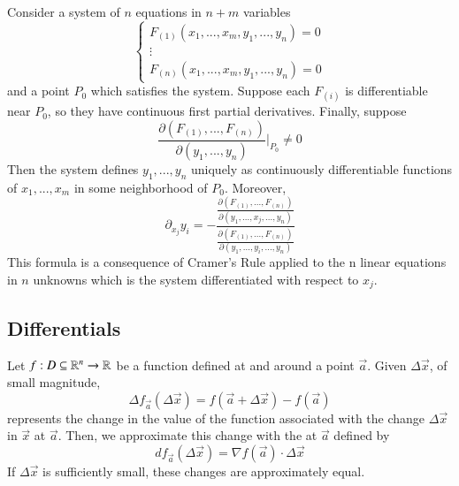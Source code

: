 \begin{appendices}
    \begin{namthm}
        Consider a system of $n$ equations in $n+m$ variables \begin{equation}
            \left\{\begin{array}{l} F_{(1)}(x_1,...,x_m,y_1,...,y_n) = 0 \\ \vdots \\ F_{(n)}(x_1,...,x_m,y_1,...,y_n) = 0 \end{array}\right.
        \end{equation}
        and a point $P_0$ which satisfies the system. Suppose each $F_{(i)}$ is differentiable near $P_0$, so they have continuous first partial derivatives. Finally, suppose \begin{equation}
            \frac{\partial(F_{(1)},...,F_{(n)})}{\partial(y_1,...,y_n)}\Big\rvert_{P_0} \neq 0
        \end{equation}
        Then the system defines $y_1,...,y_n$ uniquely as continuously differentiable functions of $x_1,...,x_m$ in some neighborhood of $P_0$. Moreover, \begin{equation}
            \partial_{x_j}y_i = -\frac{\frac{\partial(F_{(1)},...,F_{(n)})}{\partial(y_1,...,x_j,...,y_n)}}{\frac{\partial(F_{(1)},...,F_{(n)})}{\partial(y_1,...,y_i,...,y_n)}}
        \end{equation}
        This formula is a consequence of Cramer's Rule applied to the n linear equations in $n$ unknowns which is the system differentiated with respect to $x_j$.
    \end{namthm}



    \subsection{Differentials}


    \begin{defn}
        Let $f:D\subseteq \mathbb R^n\rightarrow \mathbb R$ be a function defined at and around a point $\vec{a}$. Given $\Delta \vec{x}$, of small magnitude, \begin{equation}
            \Delta f_{\vec{a}}(\Delta \vec{x}) = f(\vec{a}+\Delta \vec{x}) - f(\vec{a})
        \end{equation}
        represents the change in the value of the function associated with the change $\Delta \vec{x}$ in $\vec{x}$ at $\vec{a}$. Then, we approximate this change with the  at $\vec{a}$ defined by \begin{equation}
            df_{\vec{a}}(\Delta \vec{x}) = \nabla f(\vec{a}) \cdot \Delta \vec{x}
        \end{equation}
        If $\Delta \vec{x}$ is sufficiently small, these changes are approximately equal.
    \end{defn}



\end{appendices}
